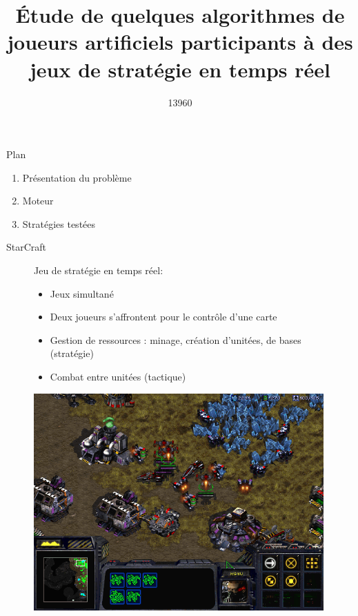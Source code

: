 \documentclass[french]{beamer}
\title{Étude de quelques algorithmes de joueurs artificiels participants à des jeux de stratégie en temps réel}
\author{13960}
\begin{document}
\begin{frame}[plain]
    \maketitle
\end{frame}
\begin{frame}{Plan}
	\begin{enumerate}
		\item Présentation du problème
		\item Moteur
		\item Stratégies testées
	\end{enumerate}
\end{frame}
\begin{frame}{StarCraft}
	\begin{figure}
		\centering
		\begin{minipage}{0.5\textwidth}
			Jeu de stratégie en temps réel:
			\begin{itemize}
				\item Jeux simultané
				\item Deux joueurs s'affrontent pour le contrôle d'une carte
				\item Gestion de ressources : minage, création d'unitées, de bases (stratégie)
				\item Combat entre unitées (tactique)
			\end{itemize}
		\end{minipage}\hfill
		\begin{minipage}{0.5\textwidth}
			\centering
			\includegraphics[width=0.99\textwidth]{screen_starcraft.png}
		\end{minipage}
	\end{figure}
\end{frame}
\end{document}
